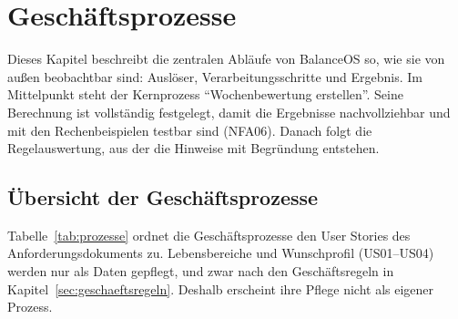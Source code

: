 \providecommand{\Ist}{\mathit{Ist}}
\providecommand{\Soll}{\mathit{Soll}}
\providecommand{\Score}{\mathit{Score}}
\providecommand{\Gesamt}{\mathit{Gesamt}}

\section{Geschäftsprozesse}\label{sec:geschaeftsprozesse}
Dieses Kapitel beschreibt die zentralen Abläufe von BalanceOS so, wie sie von außen beobachtbar sind: Auslöser, Verarbeitungsschritte und Ergebnis. Im Mittelpunkt steht der Kernprozess \enquote{Wochenbewertung erstellen}. Seine Berechnung ist vollständig festgelegt, damit die Ergebnisse nachvollziehbar und mit den Rechenbeispielen testbar sind (NFA06). Danach folgt die Regelauswertung, aus der die Hinweise mit Begründung entstehen.

\subsection{Übersicht der Geschäftsprozesse}\label{sec:prozessuebersicht}
Tabelle~\ref{tab:prozesse} ordnet die Geschäftsprozesse den User Stories des Anforderungsdokuments zu. Lebensbereiche und Wunschprofil (US01--US04) werden nur als Daten gepflegt, und zwar nach den Geschäftsregeln in Kapitel~\ref{sec:geschaeftsregeln}. Deshalb erscheint ihre Pflege nicht als eigener Prozess.

